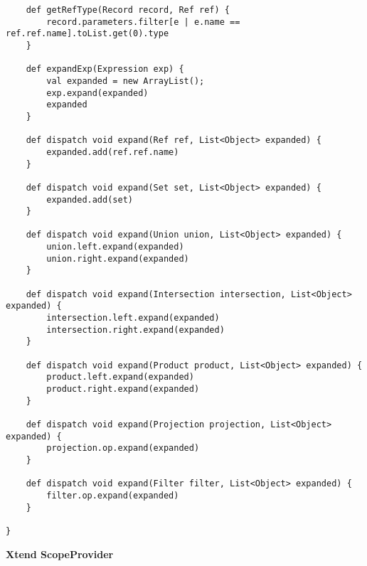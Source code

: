 \documentclass[12pt]{article}
\begin{document}
\begin{verbatim}
	def getRefType(Record record, Ref ref) {
		record.parameters.filter[e | e.name == ref.ref.name].toList.get(0).type
	}
	
	def expandExp(Expression exp) {
		val expanded = new ArrayList();
		exp.expand(expanded)
		expanded	
	}
	
	def dispatch void expand(Ref ref, List<Object> expanded) {
		expanded.add(ref.ref.name)
	}
	
	def dispatch void expand(Set set, List<Object> expanded) {
		expanded.add(set)
	}
	
	def dispatch void expand(Union union, List<Object> expanded) {
		union.left.expand(expanded)
		union.right.expand(expanded)
	}
	
	def dispatch void expand(Intersection intersection, List<Object> expanded) {
		intersection.left.expand(expanded)
		intersection.right.expand(expanded)
	}
	
	def dispatch void expand(Product product, List<Object> expanded) {
		product.left.expand(expanded)
		product.right.expand(expanded)
	}
	
	def dispatch void expand(Projection projection, List<Object> expanded) {
		projection.op.expand(expanded)
	}
	
	def dispatch void expand(Filter filter, List<Object> expanded) {
		filter.op.expand(expanded)
	}
	
}

\end{verbatim}

\textbf{Xtend ScopeProvider}
\end{document}
